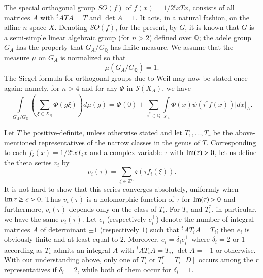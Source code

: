 The special orthogonal group $SO(f)$ of $f(x)=1/2{}^{t}xTx$, consists
of all matrices $A$ with ${}^{t}ATA=T$ and $\det A=1$. It acts, in a
natural fashion, on the affine $n$-space $X$. Denoting $SO(f)$, for
the present, by $G$, it is known that $G$ is a semi-simple linear
algebraic group (for $n>2$) defined over $\mathbb{Q}$; the adele group
$G_{A}$ has the property that $G_{A}/G_{\mathbb{Q}}$ has finite
measure. We assume that the measure $\mu$ on $G_{A}$ is normalized so
that
\begin{equation*}
  \mu(G_{A}/G_{\mathbb{Q}})=1.\tag{131}\label{chap4:sec5:subsec1:eq131}
\end{equation*}
The Siegel formula for orthogonal groups due to Weil may now be stated
once again: namely, for $n>4$ and for any $\Phi$ in $\mathscr{S}(X_{A})$,
we have
\begin{equation*}
  \int\limits_{G_{A}/G_{\mathbb{Q}}}\left(\sum_{\xi\in
    X_{\mathbb{Q}}}\Phi(g\xi)\right)d\mu(g)=\Phi(0)+\sum_{i^{\ast}
    \in\mathbb{Q}}\int\limits_{X_{A}}\Phi(x)\psi(i^{\ast}f(x))|dx|_{A}. 
  \tag{132} \label{chap4:sec5:subsec1:eq132} 
\end{equation*}

Let $T$ be positive-definite, unless otherwise stated and let
$T_{1},\ldots,T_{r}$ be the above-mentioned representatives of the
narrow classes in the genus of $T$. Corresponding to each
$f_{i}(x)=1/2{}^{t}xT_{i}x$ and a complex variable $\tau$ with
$\operatorname{Im}(\tau)>0$, let us define the theta series $v_{i}$ by 
$$
\nu_{i}(\tau)=\sum_{\xi\in\mathbb{Z}^{n}}\mathfrak{e}(\tau
f_{i}(\xi)).
$$\pageoriginale 
It is not hard to show that this series converges absolutely,
uniformly when $\operatorname{Im} \tau\geq \epsilon>0$. Thus $v_{i}(\tau)$ is a
holomorphic function of $\tau$ for $\operatorname{Im}(\tau)>0$ and furthermore,
$v_{i}(\tau)$ depends only on the class of $T_{i}$. For $T_{i}$ and
$T^{\ast}_{i}$, in particular, we have the same $\nu_{i}(\tau)$. Let
$e_{i}$ (respectively $e^{+}_{i}$) denote the number of integral
matrices $A$ of determinant $\pm 1$ (respectively $1$) such that
${}^{t}AT_{i}A=T_{i}$; then $e_{i}$ is obviously finite and at least
equal to $2$. Moreover, $e_{i}=\delta_{i}e^{+}_{i}$ where
$\delta_{i}=2$ or $1$ according as $T_{i}$ admits an integral $A$ with
${}^{t}AT_{i}A=T_{i}$, $\det A=-1$ or otherwise. With our
understanding above, only one of $T_{i}$ or $T^{\ast}_{i}=T_{i}[D]$
occurs among the $r$ representatives if $\delta_{i}=2$, while both of
them occur for $\delta_{i}=1$.

